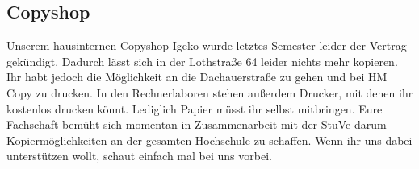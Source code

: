 \subsection{Copyshop}
Unserem hausinternen Copyshop Igeko wurde letztes Semester leider der Vertrag gekündigt. Dadurch lässt sich in der Lothstraße 64 leider nichts mehr kopieren. Ihr habt jedoch die Möglichkeit an die Dachauerstraße zu gehen und bei HM Copy zu drucken.
In den Rechnerlaboren stehen außerdem Drucker, mit denen ihr kostenlos drucken könnt. Lediglich Papier müsst ihr selbst mitbringen. 
Eure Fachschaft bemüht sich momentan in Zusammenarbeit mit der StuVe darum Kopiermöglichkeiten an der gesamten Hochschule zu schaffen. Wenn ihr uns dabei unterstützen wollt, schaut einfach mal bei uns vorbei.